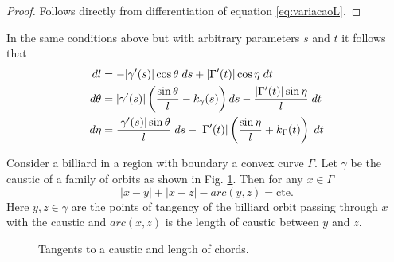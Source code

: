 \begin{proof}
Follows directly from differentiation of equation \eqref{eq:variacaoL}.
\end{proof}

\begin{proposition}\label{prop:variacaoG}
	In the same conditions above but with arbitrary parameters $s$ and $t$ it follows that
	\begin{equation}
	\aligned
	dl &= -|\gamma'(s)|  \cos\theta  \; ds + |\Gamma^\prime(t)|  \cos\eta\;  dt\\
 	d\theta &=|\gamma'(s)|  \left( \frac{\sin\theta }{l }-k_\gamma(s) \right)ds     - \frac{ |\Gamma^\prime(t) | \sin\eta}{l }\;dt\\
 d\eta&=   \frac{ |\gamma'(s)| \sin\theta }{l } \;  ds  - |\Gamma^\prime(t)| \left(  \frac{\sin\eta}{l }+k_\Gamma(t) \right) \;  dt
\endaligned
\end{equation}
\end{proposition}
  
   \begin{proposition} Consider a billiard in a region with boundary a convex curve $\Gamma$. Let $\gamma$ be the caustic of a family of orbits as shown in Fig. \ref{fig:corda2}. Then for any $x\in \Gamma$
   \[ |x-y|+|x-z|-arc(y,z) =\text{cte}.\]
   Here $y,z\in \gamma$ are the points of tangency of the billiard orbit passing through $x$ with the caustic and $arc(x,z)$ is the length of caustic between $y$ and $z$.
    \begin{figure}[H]
	\begin{center}
		\def\svgwidth{0.55\textwidth}
		
		\caption { Tangents to a caustic and length of chords.\label{fig:corda2}}
	\end{center}
\end{figure}
   \end{proposition}
   
